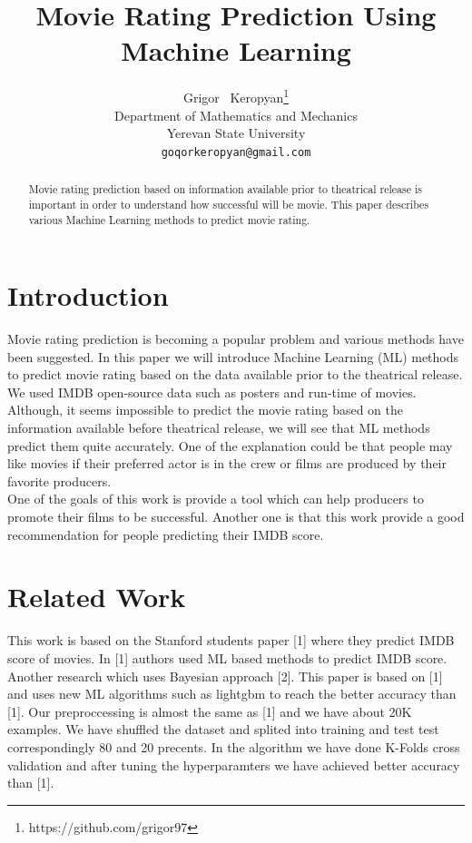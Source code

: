 \documentclass{article}
\title{Movie Rating Prediction Using Machine Learning}
\author{%
  Grigor ~Keropyan\thanks{https://github.com/grigor97} \\
  Department of Mathematics and Mechanics\\
  Yerevan State University\\
  \texttt{goqorkeropyan@gmail.com} \\
}
\begin{document}

\maketitle

\begin{abstract}
  Movie rating prediction based on information available prior to theatrical release is important in order to understand how successful will be movie. This paper describes various Machine Learning methods to predict movie rating. 
\end{abstract}

\section{Introduction}

Movie rating prediction is becoming a popular problem and various methods have been suggested. In this paper we will introduce Machine Learning (ML) methods to predict movie rating based on the data available prior to the theatrical release. We used IMDB open-source data such as posters and run-time of movies. \\

Although, it seems impossible to predict the movie rating based on the information available before theatrical release, we will see that ML methods predict them quite accurately. One of the explanation could be that people may like movies if their preferred actor is in the crew or films are produced by their favorite producers.\\

One of the goals of this work is provide a tool which can help producers to promote their films to be successful. Another one is that this work provide a good recommendation for people predicting their IMDB score. 

\section{Related Work}
\label{rel_work}

This work is based on the Stanford students paper [1] where they predict IMDB score of movies. In [1] authors used ML based methods to predict IMDB score. Another research which uses Bayesian approach [2]. This paper is based on [1] and uses new ML algorithms such as lightgbm to reach the better accuracy than [1]. Our preproccessing is almost the same as [1] and we have about 20K examples. We have shuffled the dataset and splited into training and test test correspondingly 80 and 20 precents. In the algorithm we have done K-Folds cross validation and after tuning the hyperparamters we have achieved better accuracy than [1]. 
\end{document}
